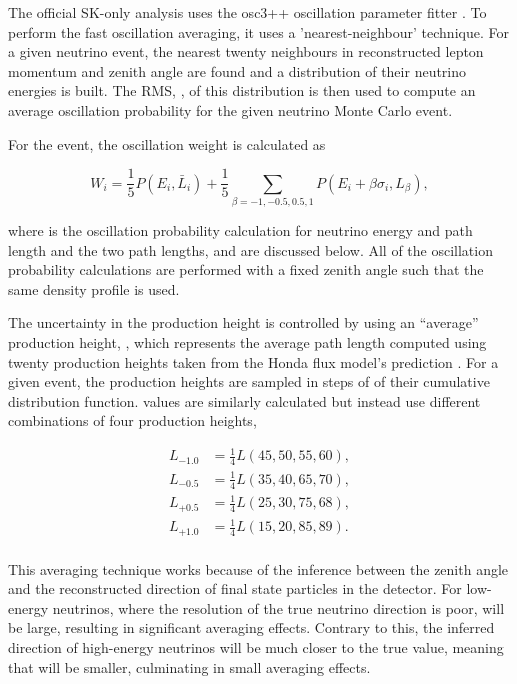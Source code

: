 The official SK-only analysis uses the osc3++ oscillation parameter fitter \cite{thesis_roger}. To perform the fast oscillation averaging, it uses a 'nearest-neighbour' technique. For a given  neutrino event, the nearest twenty  neighbours in reconstructed lepton momentum and zenith angle are found and a distribution of their neutrino energies is built. The RMS, \quickmath{\sigma}, of this distribution is then used to compute an average oscillation probability for the given neutrino Monte Carlo event. 

For the  event, the oscillation weight is calculated as

\begin{equation}
  W_{i} = \frac{1}{5} P(E_{i},\bar{L}_{i}) + \frac{1}{5} \sum_{\beta = -1, -0.5, 0.5, 1} P(E_{i} + \beta\sigma_{i},L_{\beta}),
\end{equation}

where  is the oscillation probability calculation for neutrino energy  and path length  and the two path lengths,  and  are discussed below. All of the oscillation probability calculations are performed with a fixed zenith angle such that the same density profile is used.

The uncertainty in the production height is controlled by using an ``average'' production height, , which represents the average path length computed using twenty production heights taken from the Honda flux model's prediction \cite{Honda:2011}. For a given event, the production heights are sampled in steps of  of their cumulative distribution function.  values are similarly calculated but instead use different combinations of four production heights,

\begin{equation}
  \begin{split}
    L_{-1.0} &= \frac{1}{4} L(45,50,55,60), \\
    L_{-0.5} &= \frac{1}{4} L(35,40,65,70), \\
    L_{+0.5} &= \frac{1}{4} L(25,30,75,68), \\
    L_{+1.0} &= \frac{1}{4} L(15,20,85,89). \\
  \end{split}
\end{equation}

This averaging technique works because of the inference between the zenith angle and the reconstructed direction of final state particles in the detector. For low-energy neutrinos, where the resolution of the true neutrino direction is poor,  will be large, resulting in significant averaging effects. Contrary to this, the inferred direction of high-energy neutrinos will be much closer to the true value, meaning that  will be smaller, culminating in small averaging effects.

